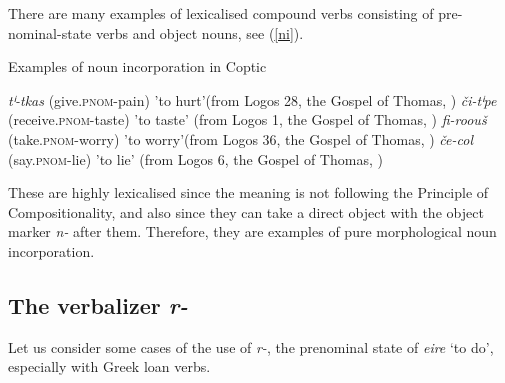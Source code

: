 \documentclass[output=paper,colorlinks,citecolor=brown ,chinesefont]{langscibook}
\begin{document}
There are many examples of lexicalised compound verbs consisting of pre-nominal-state verbs and object nouns, see (\ref{ni}). 


\begin{exe}
\ex\label{ni} Examples of noun incorporation in Coptic
    \begin{xlist}
        \ex\label{logos28} \textbf{} \textit{tⁱ-tkas} (give.\textsc{pnom}-pain) 'to hurt'(from Logos 28, the Gospel of Thomas, \citealt{layton2})
        \ex\label{logos1a} \textbf{} \textit{či-tⁱpe} (receive.\textsc{pnom}-taste) 'to taste' (from Logos 1, the Gospel of Thomas, \citealt{layton2})
        \ex\label{logos36} \textbf{} \textit{fi-roouš} (take.\textsc{pnom}-worry) 'to worry'(from Logos 36, the Gospel of Thomas, \citealt{layton2})
        \ex\label{logos6} \textbf{} \textit{če-col} (say.\textsc{pnom}-lie) 'to lie' (from Logos 6, the Gospel of Thomas, \citealt{layton2})
    \end{xlist}
\end{exe}


These are highly lexicalised since the meaning is not following the Principle of Compositionality, and also since they can take a direct object with the object marker  \textit{n-} after them. Therefore, they are examples of pure morphological noun incorporation.

\subsection{The verbalizer  \textit{r-}}
\largerpage[2]
Let us consider some cases of the use of  \textit{r-}, the prenominal state of  \textit{eire} ‘to do', especially with Greek loan verbs.
\end{document}
